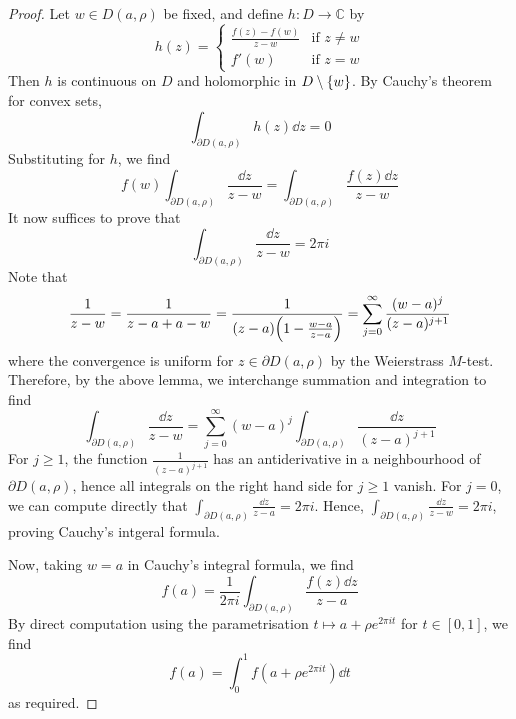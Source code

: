 \begin{proof}
	Let \( w \in D(a,\rho) \) be fixed, and define \( h \colon D \to \mathbb C \) by
	\[
		h(z) = \begin{cases}
			\frac{f(z) - f(w)}{z - w} & \text{if } z \neq w \\
			f'(w)                     & \text{if } z = w
		\end{cases}
	\]
	Then \( h \) is continuous on \( D \) and holomorphic in \( D \setminus \qty{w} \).
	By Cauchy's theorem for convex sets,
	\[
		\int_{\partial D(a,\rho)} h(z) \dd{z} = 0
	\]
	Substituting for \( h \), we find
	\[
		f(w) \int_{\partial D(a,\rho)} \frac{\dd{z}}{z-w} = \int_{\partial D(a,\rho)} \frac{f(z) \dd{z}}{z-w}
	\]
	It now suffices to prove that
	\[
		\int_{\partial D(a,\rho)} \frac{\dd{z}}{z-w} = 2 \pi i
	\]
	Note that
	\[
		\frac{1}{z-w} = \frac{1}{z-a+a-w} = \frac{1}{\qty(z-a)\qty(1 - \frac{w-a}{z-a})} = \sum_{j=0}^\infty \frac{(w-a)^j}{(z-a)^{j+1}}
	\]
	where the convergence is uniform for \( z \in \partial D(a,\rho) \) by the Weierstrass \( M \)-test.
	Therefore, by the above lemma, we interchange summation and integration to find
	\[
		\int_{\partial D(a,\rho)} \frac{\dd{z}}{z-w} = \sum_{j=0}^\infty (w-a)^j \int_{\partial D(a,\rho)} \frac{\dd{z}}{(z-a)^{j+1}}
	\]
	For \( j \geq 1 \), the function \( \frac{1}{(z-a)^{j+1}} \) has an antiderivative in a neighbourhood of \( \partial D(a,\rho) \), hence all integrals on the right hand side for \( j \geq 1 \) vanish.
	For \( j = 0 \), we can compute directly that \( \int_{\partial D(a,\rho)} \frac{\dd{z}}{z-a} = 2 \pi i \).
	Hence, \( \int_{\partial D(a,\rho)} \frac{\dd{z}}{z-w} = 2 \pi i \), proving Cauchy's intgeral formula.

	Now, taking \( w = a \) in Cauchy's integral formula, we find
	\[
		f(a) = \frac{1}{2\pi i} \int_{\partial D(a,\rho)} \frac{f(z) \dd{z}}{z-a}
	\]
	By direct computation using the parametrisation \( t \mapsto a + \rho e^{2\pi i t} \) for \( t \in [0,1] \), we find
	\[
		f(a) = \int_0^1 f(a+\rho e^{2 \pi i t}) \dd{t}
	\]
	as required.
\end{proof}

